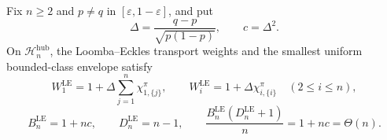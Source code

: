 Fix \(n\ge2\) and \(p\ne q\) in \([\varepsilon,1-\varepsilon]\), and put
\[
 \Delta=\frac{q-p}{\sqrt{p(1-p)}},
 \qquad c=\Delta^2.
\]
On \(\mathcal H_n^{\mathrm{hub}}\), the Loomba--Eckles transport weights and the smallest uniform bounded-class envelope satisfy
\[
 W_1^{\mathrm{LE}}
 =1+\Delta\sum_{j=1}^n\chi_{1,\{j\}}^{\pi},
 \qquad
 W_i^{\mathrm{LE}}=1+\Delta\chi_{i,\{i\}}^{\pi}\quad(2\le i\le n),
\]
\[
 B_n^{\mathrm{LE}}=1+nc,
 \qquad D_n^{\mathrm{LE}}=n-1,
 \qquad
 \frac{B_n^{\mathrm{LE}}(D_n^{\mathrm{LE}}+1)}{n}=1+nc=\Theta(n).
\]